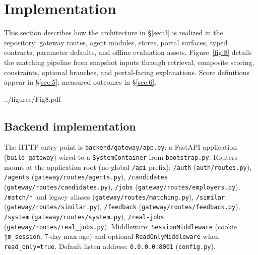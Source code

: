 \section{Implementation}\label{sec:4}

This section describes how the architecture in \S\ref{sec:3} is realized in the repository: gateway routes, agent modules, stores, portal surfaces, typed contracts, parameter defaults, and offline evaluation assets.
Figure~\ref{fig:8} details the matching pipeline from snapshot inputs through retrieval, composite scoring, constraints, optional branches, and portal-facing explanations.
Score definitions appear in \S\ref{sec:5}; measured outcomes in \S\ref{sec:6}.

\begin{JFigure}{../figures/Fig8.pdf}
\end{JFigure}

\subsection{Backend implementation}\label{sec:4-backend}

The HTTP entry point is \texttt{backend/gateway/app.py}: a FastAPI application (\texttt{build\_gateway}) wired to a \texttt{SystemContainer} from \texttt{bootstrap.py}.
Routers mount at the application root (no global \texttt{/api} prefix):
\texttt{/auth} (\texttt{auth/routes.py}),
\texttt{/agents} (\texttt{gateway/routes/agents.py}),
\texttt{/candidates} (\texttt{gateway/routes/candidates.py}),
\texttt{/jobs} (\texttt{gateway/routes/employers.py}),
\texttt{/match/*} and legacy aliases (\texttt{gateway/routes/matching.py}),
\texttt{/similar} (\texttt{gateway/routes/similar.py}),
\texttt{/feedback} (\texttt{gateway/routes/feedback.py}),
\texttt{/system} (\texttt{gateway/routes/system.py}),
\texttt{/real-jobs} (\texttt{gateway/routes/real\_jobs.py}).
Middleware: \texttt{SessionMiddleware} (cookie \texttt{jm\_session}, 7-day max age) and optional \texttt{ReadOnlyMiddleware} when \texttt{read\_only=true}.
Default listen address: \texttt{0.0.0.0:8001} (\texttt{config.py}).

